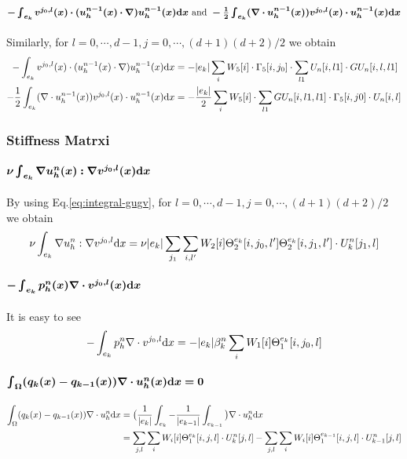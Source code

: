 \paragraph{$\bm{-\int_{e_k}v^{j_0,l}(x)\cdot(u_h^{n-1}(x)\cdot\nabla)
u_h^{n-1}(x)\mathrm{d} x
\text{ and }-\frac{1}{2}\int_{e_k}(\nabla\cdot u_h^{n-1}(x))v^{j_0,l}(x)
\cdot u_h^{n-1}(x)\mathrm{d} x}$}
Similarly, for $l=0,\cdots,d-1,j=0,\cdots,(d+1)(d+2)/2$ we obtain
\begin{equation}
  \begin{split}
    -\int_{e_k} v^{j_0,l}(x)\cdot(u_h^{n-1}(x)\cdot\nabla)u_h^{n-1}(x)\mathrm{d} x
    &= -|e_k|\sum_iW_5[i]\cdot\Gamma_5[i,j_0]\cdot
    \sum_{l1}U_n[i,l1]\cdot GU_n[i,l,l1] \\
    -\frac12\int_{e_k}(\nabla\cdot u_h^{n-1}(x))v^{j_0,l}(x)\cdot u_h^{n-1}(x)\mathrm{d} x
    &= -\frac{|e_k|}2\sum_iW_5[i]\cdot\sum_{l1}GU_n[i,l1,l1]
    \cdot \Gamma_5[i,j0] \cdot U_n[i,l]
  \end{split}
\end{equation}

\subsubsection{Stiffness Matrxi}
\paragraph{$\bm{\nu\int_{e_k}\nabla u_h^n(x):\nabla v^{j_0,l}(x)\mathrm{d} x}$} 
By using Eq.\eqref{eq:integral-gugv}, 
for $l=0,\cdots,d-1,j=0,\cdots,(d+1)(d+2)/2$ we obtain
\begin{equation}
    \nu\int_{e_k} \nabla u_h^n:\nabla v^{j_0,l}\mathrm{d} x = \nu|e_k| \sum_{j_1} 
    \sum_{i,l'}W_2[i]\Theta_2^{e_k}[i,j_0,l']\Theta_2^{e_k}[i,j_1,l'] 
    \cdot U^n_k[j_1,l]
\end{equation}

\paragraph{$\bm{-\int_{e_k}p_h^n(x)\nabla\cdot v^{j_0,l}(x)\mathrm{d} x}$}
It is easy to see
\begin{equation}
    -\int_{e_k} p_h^n\nabla\cdot v^{j_0,l}\mathrm{d} x
    = -|e_k| \beta^n_k\sum_i W_1[i] \Theta_1^{e_k}[i,j_0,l]
\end{equation}

\paragraph{$\bm{\int_{\Omega}(q_k(x)-q_{k-1}(x))\nabla\cdot u_h^n(x)\mathrm{d} x=0}$}
\begin{equation}
  \begin{split}
    \int_\Omega(q_k(x)-q_{k-1}(x))\nabla\cdot u_h^n\mathrm{d} x &=
    \big(\frac1{|e_k|}\int_{e_k}-\frac1{|e_{k-1}|}\int_{e_{k-1}}\big)
    \nabla \cdot u_h^n\mathrm{d} x \\
    &= \sum_{j,l}\sum_{i} W_i[i]\Theta_1^{e_k}[i,j,l]\cdot U_k^n[j,l] 
    -\sum_{j,l}\sum_{i} W_i[i]\Theta_1^{e_{k-1}}[i,j,l]\cdot U_{k-1}^n[j,l]
  \end{split}
\end{equation}

